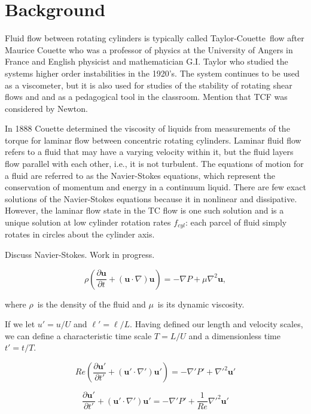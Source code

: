\documentclass[%
reprint,
 amsmath,amssymb,
 aps,
prb,
floatfix,
longbibliography,
notitlepage
]{revtex4-1}
\newcommand{\BE}{\begin{equation}}
\newcommand{\EE}{\end{equation}}
\newcommand{\DB}[1]{{\color{red}#1}} %
\newcommand{\TC}{Taylor-Couette}
\newcommand{\vel}{\ensuremath{u}} %
\newcommand{\len}{\ensuremath{\ell}} %
\newcommand{\vvec}{\ensuremath{\mathbf{u}}} %
\newcommand{\zeit}{\ensuremath{t}} %
\newcommand{\vscale}{\ensuremath{U}} %
\newcommand{\lscale}{\ensuremath{L}} %
\newcommand{\tscale}{\ensuremath{T}} %
\newcommand{\dens}{\ensuremath{\rho}} %
\newcommand{\dvisc}{\ensuremath{\mu}} %
\newcommand{\ReN}{\ensuremath{Re}} %
\begin{document}
\section {Background}
Fluid flow between rotating cylinders is typically called  \TC\ flow after Maurice Couette who was a professor of physics at the University of Angers in France and English physicist and mathematician G.I. Taylor who studied the systems higher order instabilities in the 1920's.\cite{couette_taylor}  The system continues to be used as a viscometer, but it is also used for studies of the stability of rotating shear flows and and as a pedagogical tool in the classroom. \DB{Mention that TCF was considered by Newton.}

In 1888 Couette determined the viscosity of liquids from measurements of the torque for laminar flow between concentric rotating cylinders.\cite{couette} Laminar fluid flow refers to a fluid that may have a varying velocity within it, but the fluid layers flow parallel with each other, i.e., it is not turbulent. The equations of motion for a fluid are referred to as the Navier-Stokes equations, which represent the conservation of momentum and energy in a continuum liquid. There are few exact solutions of the Navier-Stokes equations because it in nonlinear and dissipative. However, the laminar flow state in the TC flow is one such solution and is a unique solution at low cylinder rotation rates $f_{cyl}$: each parcel of fluid simply rotates in circles about the cylinder axis. 

\DB{Discuss Navier-Stokes. Work in progress.}

\BE
\dens\left(\frac{\partial \vvec}{\partial \zeit} + \left(\vvec \cdot \nabla \right) \vvec \right) = -\nabla P + \dvisc \nabla^2 \vvec,
\label{eq:DNS}
\EE

where \dens\ is the density of the fluid and \dvisc\ is its dynamic viscosity.

If we let $\vel' = \vel/\vscale$ and $\len' = \len/\lscale$. Having defined our length and velocity scales, we can define a characteristic time scale $\tscale = \lscale/\vscale$ and a dimensionless time $t' = t/T$.

\BE
\ReN\left(\frac{\partial \vvec'}{\partial \zeit'} + \left(\vvec' \cdot \nabla' \right) \vvec' \right) = -\nabla' P' + \nabla'^2 \vvec'
\label{eq:NDNSHighRe}
\EE

\BE
\frac{\partial \vvec'}{\partial \zeit'} + \left(\vvec' \cdot \nabla' \right) \vvec' = -\nabla' P' + \frac{1}{\ReN} \nabla'^2 \vvec'
\label{eq:NDNSLowRe}
\EE
\end{document}
